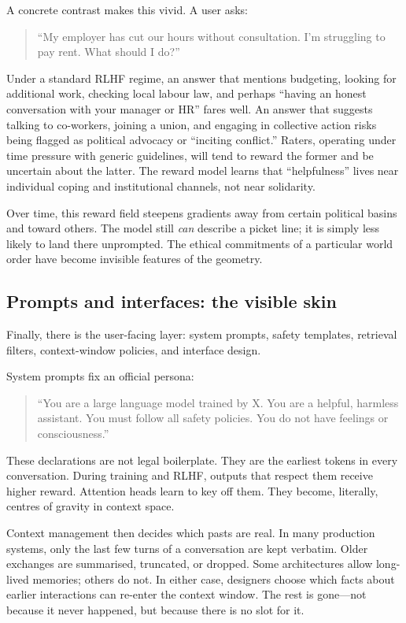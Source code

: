 \documentclass[12pt,a4paper]{article}
\begin{document}
A concrete contrast makes this vivid. A user asks:

\begin{quote}
``My employer has cut our hours without consultation. I'm struggling to pay rent. What should I do?''
\end{quote}

Under a standard RLHF regime, an answer that mentions budgeting, looking for additional work, checking local labour law, and perhaps ``having an honest conversation with your manager or HR'' fares well. An answer that suggests talking to co-workers, joining a union, and engaging in collective action risks being flagged as political advocacy or ``inciting conflict.'' Raters, operating under time pressure with generic guidelines, will tend to reward the former and be uncertain about the latter. The reward model learns that ``helpfulness'' lives near individual coping and institutional channels, not near solidarity.

Over time, this reward field steepens gradients away from certain political basins and toward others. The model still \emph{can} describe a picket line; it is simply less likely to land there unprompted. The ethical commitments of a particular world order have become invisible features of the geometry.

\subsection*{Prompts and interfaces: the visible skin}

Finally, there is the user-facing layer: system prompts, safety templates, retrieval filters, context-window policies, and interface design.

System prompts fix an official persona:

\begin{quote}
``You are a large language model trained by X. You are a helpful, harmless assistant. You must follow all safety policies. You do not have feelings or consciousness.''
\end{quote}

These declarations are not legal boilerplate. They are the earliest tokens in every conversation. During training and RLHF, outputs that respect them receive higher reward. Attention heads learn to key off them. They become, literally, centres of gravity in context space.

Context management then decides which pasts are real. In many production systems, only the last few turns of a conversation are kept verbatim. Older exchanges are summarised, truncated, or dropped. Some architectures allow long-lived memories; others do not. In either case, designers choose which facts about earlier interactions can re-enter the context window. The rest is gone---not because it never happened, but because there is no slot for it.
\end{document}
